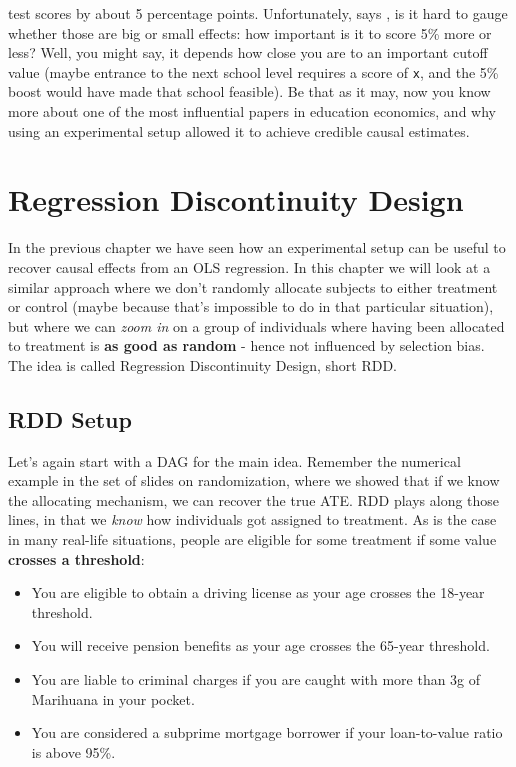 \documentclass[]{book}
\providecommand{\tightlist}{%
  \setlength{\itemsep}{0pt}\setlength{\parskip}{0pt}}
\begin{document}
test scores by about 5 percentage points. Unfortunately, says \citet{krueger1999}, is it hard to gauge whether those are big or small effects: how important is it to score 5\% more or less? Well, you might say, it depends how close you are to an important cutoff value (maybe entrance to the next school level requires a score of \texttt{x}, and the 5\% boost would have made that school feasible). Be that as it may, now you know more about one of the most influential papers in education economics, and why using an experimental setup allowed it to achieve credible causal estimates.

\hypertarget{RDD}{%
\chapter{Regression Discontinuity Design}\label{RDD}}

In the previous chapter we have seen how an experimental setup can be useful to recover causal effects from an OLS regression. In this chapter we will look at a similar approach where we don't randomly allocate subjects to either treatment or control (maybe because that's impossible to do in that particular situation), but where we can \emph{zoom in} on a group of individuals where having been allocated to treatment is \textbf{as good as random} - hence not influenced by selection bias. The idea is called Regression Discontinuity Design, short RDD.

\hypertarget{rdd-setup}{%
\section{RDD Setup}\label{rdd-setup}}

Let's again start with a DAG for the main idea. Remember the numerical example in the set of slides on randomization, where we showed that if we know the allocating mechanism, we can recover the true ATE. RDD plays along those lines, in that we \emph{know} how individuals got assigned to treatment. As is the case in many real-life situations, people are eligible for some treatment if some value \textbf{crosses a threshold}:

\begin{itemize}
\tightlist
\item
  You are eligible to obtain a driving license as your age crosses the 18-year threshold.
\item
  You will receive pension benefits as your age crosses the 65-year threshold.
\item
  You are liable to criminal charges if you are caught with more than 3g of Marihuana in your pocket.
\item
  You are considered a subprime mortgage borrower if your loan-to-value ratio is above 95\%.
\end{itemize}
\end{document}
